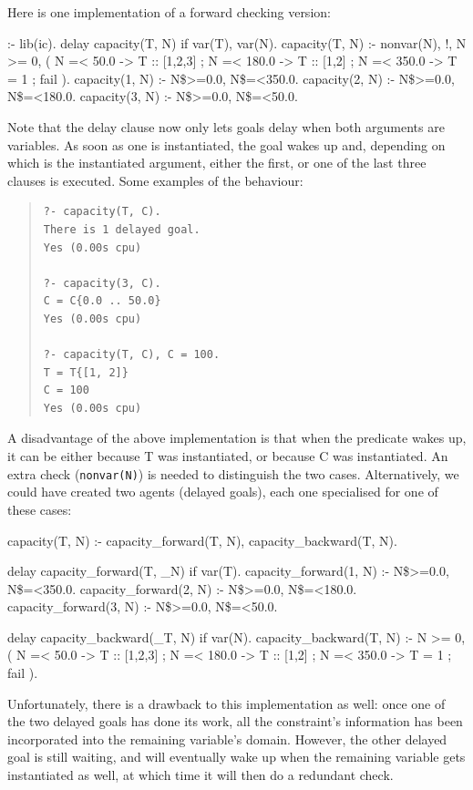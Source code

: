 Here is one implementation of a forward checking version:
\begin{code}
:- lib(ic).
delay capacity(T, N) if var(T), var(N).
capacity(T, N) :- nonvar(N), !,
        N >= 0,
        ( N =< 50.0 -> T :: [1,2,3]
        ; N =< 180.0 -> T :: [1,2]
        ; N =< 350.0 -> T = 1
        ; fail
        ).
capacity(1, N) :- N\$>=0.0, N\$=<350.0.
capacity(2, N) :- N\$>=0.0, N\$=<180.0.
capacity(3, N) :- N\$>=0.0, N\$=<50.0.
\end{code}
Note that the delay clause now only lets goals delay when both
arguments are variables. As soon as one is instantiated, the
goal wakes up and, depending on which is the instantiated argument,
either the first, or one of the last three clauses is executed.
Some examples of the behaviour:
\begin{quote}\begin{verbatim}
?- capacity(T, C).
There is 1 delayed goal.
Yes (0.00s cpu)

?- capacity(3, C).
C = C{0.0 .. 50.0}
Yes (0.00s cpu)

?- capacity(T, C), C = 100.
T = T{[1, 2]}
C = 100
Yes (0.00s cpu)
\end{verbatim}\end{quote}

A disadvantage of the above implementation is that when the predicate wakes
up, it can be either because T was instantiated, or because C was
instantiated. An extra check ({\tt nonvar(N)}) is needed to distinguish the two cases.
Alternatively, we could have created two agents (delayed goals), each one
specialised for one of these cases:
\begin{code}
capacity(T, N) :-
        capacity_forward(T, N),
        capacity_backward(T, N).

delay capacity_forward(T, _N) if var(T).
capacity_forward(1, N) :- N\$>=0.0, N\$=<350.0.
capacity_forward(2, N) :- N\$>=0.0, N\$=<180.0.
capacity_forward(3, N) :- N\$>=0.0, N\$=<50.0.

delay capacity_backward(_T, N) if var(N).
capacity_backward(T, N) :-
        N >= 0,
        ( N =< 50.0 -> T :: [1,2,3]
        ; N =< 180.0 -> T :: [1,2]
        ; N =< 350.0 -> T = 1
        ; fail
        ).
\end{code}
Unfortunately, there is a drawback to this implementation as well:
once one of the two delayed goals has done its work, all the constraint's
information has been incorporated into the remaining variable's domain.
However, the other delayed goal is still waiting, and will eventually
wake up when the remaining variable gets instantiated as well, at which time
it will then do a redundant check.

